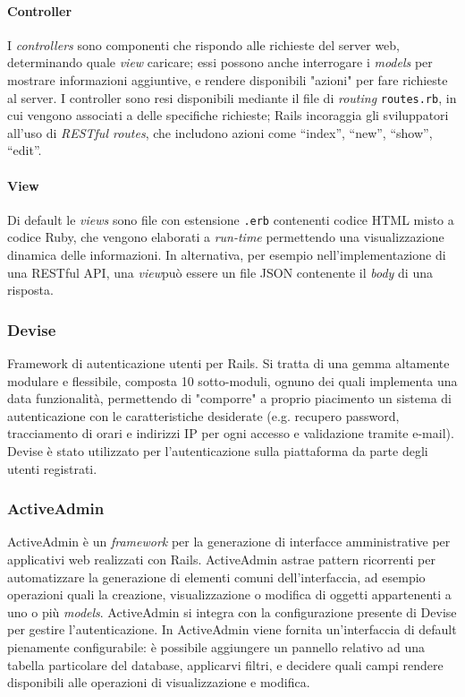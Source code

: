 \paragraph{Controller}
I \textit{controllers} sono componenti che rispondo alle richieste del server web, determinando quale \textit{view} caricare; essi possono anche interrogare i \textit{models} per mostrare informazioni aggiuntive, e rendere disponibili "azioni" per fare richieste al server. I controller sono resi disponibili mediante il file di \textit{routing} \texttt{routes.rb}, in cui vengono associati a delle specifiche richieste; Rails incoraggia gli sviluppatori all'uso di \textit{RESTful routes}, che includono azioni come ``index'', ``new'', ``show'', ``edit''.

\paragraph{View}
Di default le \textit{views} sono file con estensione \texttt{.erb} contenenti codice HTML misto a codice Ruby, che vengono elaborati a \textit{run-time} permettendo una visualizzazione dinamica delle informazioni. In alternativa, per esempio nell'implementazione di una RESTful API, una \textit{view}può essere un file JSON contenente il \textit{body} di una risposta.

\subsubsection{Devise}
Framework di autenticazione utenti per Rails. Si tratta di una gemma altamente modulare e flessibile, composta 10 sotto-moduli, ognuno dei quali implementa una data funzionalità, permettendo di "comporre" a proprio piacimento un sistema di autenticazione con le caratteristiche desiderate (e.g. recupero password, tracciamento di orari e indirizzi IP per ogni accesso e validazione tramite e-mail). Devise è stato utilizzato per l'autenticazione sulla piattaforma da parte degli utenti registrati.

\subsubsection{ActiveAdmin}
ActiveAdmin è un \textit{framework} per la generazione di interfacce amministrative per applicativi web realizzati con Rails. ActiveAdmin astrae pattern ricorrenti per automatizzare la generazione di elementi comuni dell'interfaccia, ad esempio operazioni quali la creazione, visualizzazione o modifica di oggetti appartenenti a uno o più \textit{models}. ActiveAdmin si integra con la configurazione presente di Devise per gestire l'autenticazione. In ActiveAdmin viene fornita un'interfaccia di default pienamente configurabile: è possibile aggiungere un pannello relativo ad una tabella particolare del database, applicarvi filtri, e decidere quali campi rendere disponibili alle operazioni di visualizzazione e modifica.

